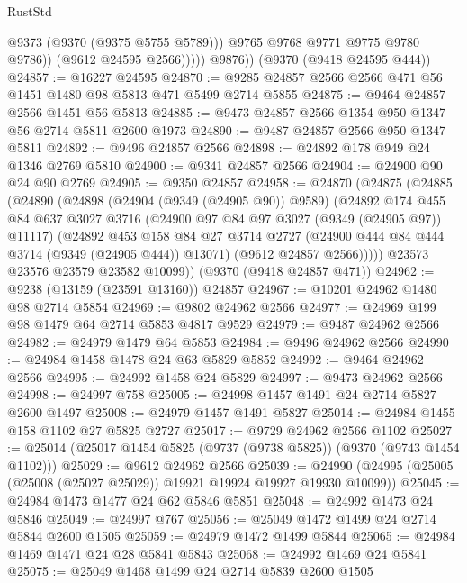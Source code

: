 \begin{lexlean}{RustStd}
\begin{coremodule}
{\begin{coremodule}
{{{{{{{{{{{{{{{{{{{{{{{{{{{{{{{{{{{{{{{                      @9373
                      (@9370 (@9375 @5755 @5789)))
                    @9765
                    @9768
                    @9771
                    @9775
                    @9780
                    @9786))
                (@9612 @24595 @2566)))))
        @9876))
    (@9370 (@9418 @24595 @444))
@24857 := @16227 @24595
@24870 := @9285 @24857 @2566 @2566 @471 @56 @1451 @1480 @98 @5813 @471 @5499 @2714 @5855
@24875 := @9464 @24857 @2566 @1451 @56 @5813
@24885 := @9473 @24857 @2566 @1354 @950 @1347 @56 @2714 @5811 @2600 @1973
@24890 := @9487 @24857 @2566 @950 @1347 @5811
@24892 := @9496 @24857 @2566
@24898 := @24892 @178 @949 @24 @1346 @2769 @5810
@24900 := @9341 @24857 @2566
@24904 := @24900 @90 @24 @90 @2769
@24905 := @9350 @24857
@24958 := @24870
    (@24875
      (@24885
        (@24890
          (@24898
            (@24904 (@9349 (@24905 @90)) @9589)
            (@24892
              @174
              @455
              @84
              @637
              @3027
              @3716
              (@24900 @97 @84 @97 @3027 (@9349 (@24905 @97)) @11117)
              (@24892
                @453
                @158
                @84
                @27
                @3714
                @2727
                (@24900 @444 @84 @444 @3714 (@9349 (@24905 @444)) @13071)
                (@9612 @24857 @2566)))))
        @23573
        @23576
        @23579
        @23582
        @10099))
    (@9370 (@9418 @24857 @471))
@24962 := @9238 (@13159 (@23591 @13160)) @24857
@24967 := @10201 @24962 @1480 @98 @2714 @5854
@24969 := @9802 @24962 @2566
@24977 := @24969 @199 @98 @1479 @64 @2714 @5853 @4817 @9529
@24979 := @9487 @24962 @2566
@24982 := @24979 @1479 @64 @5853
@24984 := @9496 @24962 @2566
@24990 := @24984 @1458 @1478 @24 @63 @5829 @5852
@24992 := @9464 @24962 @2566
@24995 := @24992 @1458 @24 @5829
@24997 := @9473 @24962 @2566
@24998 := @24997 @758
@25005 := @24998 @1457 @1491 @24 @2714 @5827 @2600 @1497
@25008 := @24979 @1457 @1491 @5827
@25014 := @24984 @1455 @158 @1102 @27 @5825 @2727
@25017 := @9729 @24962 @2566 @1102
@25027 := @25014 (@25017 @1454 @5825 (@9737 (@9738 @5825)) (@9370 (@9743 @1454 @1102)))
@25029 := @9612 @24962 @2566
@25039 := @24990 (@24995 (@25005 (@25008 (@25027 @25029)) @19921 @19924 @19927 @19930 @10099))
@25045 := @24984 @1473 @1477 @24 @62 @5846 @5851
@25048 := @24992 @1473 @24 @5846
@25049 := @24997 @767
@25056 := @25049 @1472 @1499 @24 @2714 @5844 @2600 @1505
@25059 := @24979 @1472 @1499 @5844
@25065 := @24984 @1469 @1471 @24 @28 @5841 @5843
@25068 := @24992 @1469 @24 @5841
@25075 := @25049 @1468 @1499 @24 @2714 @5839 @2600 @1505
}}}}}}}}}}}}}}}}}}}}}}}}}}}}}}}}}}}}}}}
\end{coremodule}}
\end{coremodule}
\end{lexlean}
